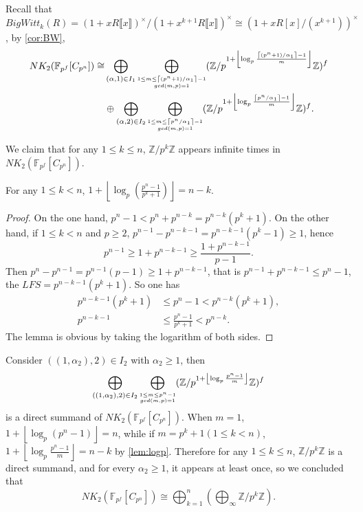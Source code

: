 Recall that $BigWitt_{k}(R)=(1+x R\llbracket x\rrbracket )^{\times}/(1+x^{k+1} R\llbracket x\rrbracket )^{\times} \cong (1+x R[x]/(x^{k+1}))^{\times}$, 
by \ref{cor:BW}, 
\begin{align*}
NK_2(\mathbb{F}_{p^f}[C_{p^n}])\cong & \bigoplus_{(\alpha,1)\in I_1}\bigoplus_{\scriptsize\substack{1\leq m\leq \left \lceil (p^n+1)/\alpha_1 \right \rceil-1 \\ gcd(m,p)=1}}(\mathbb{Z}/p^{1+ \left \lfloor\log_p \frac{\left \lceil (p^n+1)/\alpha_1 \right \rceil-1}{m}  \right \rfloor}\mathbb{Z})^f \\
& \oplus \bigoplus_{(\alpha,2)\in I_2}\bigoplus_{\scriptsize\substack{ 1 \leq m\leq \left \lceil p^n/\alpha_1 \right \rceil-1 \\ gcd(m,p)=1}}(\mathbb{Z}/p^{1+ \left \lfloor\log_p \frac{\left \lceil p^n/\alpha_1 \right \rceil-1}{m}  \right \rfloor}\mathbb{Z})^f.
\end{align*}

We claim that for any $1\leq k\leq n$, $\mathbb{Z}/p^k \mathbb{Z}$ appears infinite times in $NK_2(\mathbb{F}_{p^f}[C_{p^n}])$.

\begin{lemma}
\label{lem:logp}
	For any $1\leq k < n$, $1+\left \lfloor \log_p(\frac{p^n-1}{p^k+1}) \right \rfloor = n-k$. 
\end{lemma}
\begin{proof}
	On the one hand, $p^n-1<p^n+p^{n-k}=p^{n-k}(p^k+1)$.
	On the other hand, if $1\leq k < n$ and $p\geq 2$, $p^{n-1}-p^{n-k-1}=p^{n-k-1}(p^k-1)\geq 1$, hence
	\[p^{n-1}\geq 1+p^{n-k-1}\geq \frac{1+p^{n-k-1}}{p-1}.\]
	Then $p^n-p^{n-1}=p^{n-1}(p-1)\geq 1+p^{n-k-1}$, that is $p^{n-1}+p^{n-k-1}\leq p^n-1$, the $LFS=p^{n-k-1}(p^k+1)$. So one has
	\begin{align*}
	p^{n-k-1}(p^k+1) &\leq p^n-1<p^{n-k}(p^k+1), \\
	p^{n-k-1} &\leq \frac{p^n-1}{p^k+1}<p^{n-k}.
	\end{align*}
	The lemma is obvious by taking the logarithm of both sides. 
\end{proof}
Consider $((1,\alpha_2),2)\in I_2$ with $\alpha_2\geq 1$, then
$$\bigoplus_{((1,\alpha_2),2)\in I_2}\bigoplus_{\scriptsize\substack{1\leq m\leq  p^n-1 \\ gcd(m,p)=1 }}(\mathbb{Z}/p^{1+ \left \lfloor\log_p \frac{p^n-1}{m}  \right \rfloor}\mathbb{Z})^f$$
is a direct summand of $NK_2(\mathbb{F}_{p^f}[C_{p^n}])$. When $m=1$, $1+ \left \lfloor\log_p (p^n-1)\right \rfloor=n$, while if $m=p^k+1 (1\leq k < n)$, $1+ \left \lfloor\log_p \frac{p^n-1}{m}\right \rfloor=n-k$ by \ref{lem:logp}. Therefore for any $1\leq k\leq n$, $\mathbb{Z}/p^k\mathbb{Z}$ is a direct summand, and for every $\alpha_2\geq 1$, it appears at least once, so we concluded that
\[NK_2(\mathbb{F}_{p^f}[C_{p^n}])\cong \bigoplus_{k=1}^n (\bigoplus_\infty \mathbb{Z}/p^k\mathbb{Z}).\]









